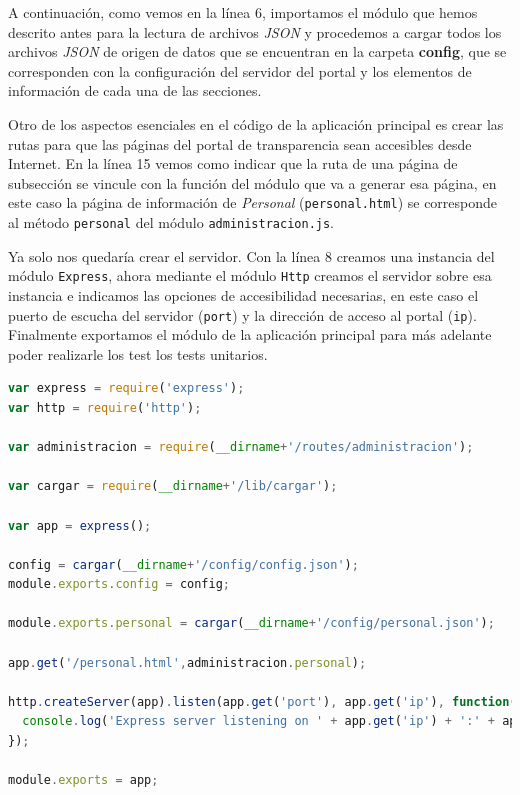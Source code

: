 \bigskip
A continuación, como vemos en la línea 6, importamos el módulo que hemos descrito antes para la lectura de archivos \textit{JSON} y procedemos a cargar todos los archivos \textit{JSON} de origen de datos que se encuentran en la carpeta \textbf{config}, que se corresponden con la configuración del servidor del portal y los elementos de información de cada una de las secciones.

\bigskip
Otro de los aspectos esenciales en el código de la aplicación principal es crear las rutas para que las páginas del portal de transparencia sean accesibles desde Internet. En la línea 15 vemos como indicar que la ruta de una página de subsección se vincule con la función del módulo que va a generar esa página, en este caso la página de información de \textit{Personal} ({\tt personal.html}) se corresponde al método {\tt personal} del módulo {\tt administracion.js}.

\newpage

Ya solo nos quedaría crear el servidor. Con la línea 8 creamos una instancia del módulo {\tt Express}, ahora mediante el módulo {\tt Http} creamos el servidor sobre esa instancia e indicamos las opciones de accesibilidad necesarias, en este caso el puerto de escucha del servidor ({\tt port}) y la dirección de acceso al portal ({\tt ip}). Finalmente exportamos el módulo de la aplicación principal para más adelante poder realizarle los test los tests unitarios.

\begin{lstlisting}[language=javascript,caption={Archivo app.js},label={lst:appjs}]
var express = require('express');
var http = require('http');

var administracion = require(__dirname+'/routes/administracion');

var cargar = require(__dirname+'/lib/cargar');

var app = express();

config = cargar(__dirname+'/config/config.json');
module.exports.config = config;

module.exports.personal = cargar(__dirname+'/config/personal.json');

app.get('/personal.html',administracion.personal);

http.createServer(app).listen(app.get('port'), app.get('ip'), function(){
  console.log('Express server listening on ' + app.get('ip') + ':' + app.get('port'));
});

module.exports = app;
\end{lstlisting}

